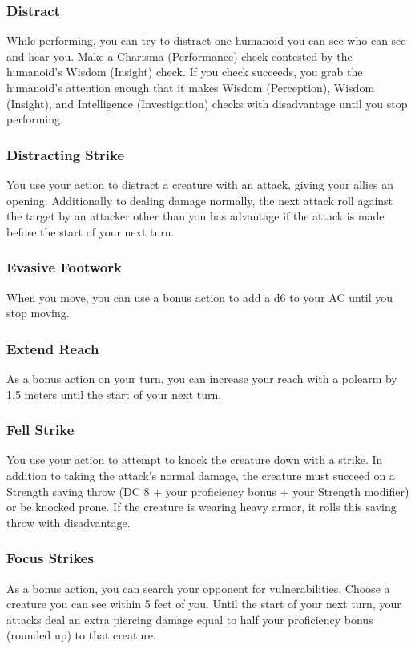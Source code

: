 \subsubsection{Distract} \label{tec::distract}
While performing, you can try to distract one humanoid you can see who can see and hear you.
Make a Charisma (Performance) check contested by the humanoid's Wisdom (Insight) check.
If you check succeeds, you grab the humanoid's attention enough that it makes Wisdom (Perception), Wisdom (Insight), and Intelligence (Investigation) checks with disadvantage until you stop performing.

\subsubsection{Distracting Strike} \label{tec::distractingstrike}
You use your action to distract a creature with an attack, giving your allies an opening.
Additionally to dealing damage normally, the next attack roll against the target by an attacker other than you has advantage if the attack is made before the start of your next turn.

\subsubsection{Evasive Footwork} \label{tec::evasivefootwork}
When you move, you can use a bonus action to add a d6 to your AC until you stop moving.

\subsubsection{Extend Reach} \label{tec::extendreach}
As a bonus action on your turn, you can increase your reach with a polearm by 1.5 meters until the start of your next turn.

\subsubsection{Fell Strike} \label{tec::fellstrike}
You use your action to attempt to knock the creature down with a strike.
In addition to taking the attack's normal damage, the creature must succeed on a Strength saving throw (DC 8 + your proficiency bonus + your Strength modifier) or be knocked prone.
If the creature is wearing heavy armor, it rolls this saving throw with disadvantage.

\subsubsection{Focus Strikes} \label{tec::focusstrikes}
As a bonus action, you can search your opponent for vulnerabilities.
Choose a creature you can see within 5 feet of you.
Until the start of your next turn, your attacks deal an extra piercing damage equal to half your proficiency bonus (rounded up) to that creature.

